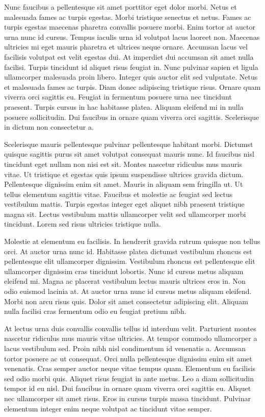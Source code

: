\documentclass[11pt,a4paper]{article}
\begin{document}
Nunc faucibus a pellentesque sit amet porttitor eget dolor morbi. Netus et malesuada fames ac turpis egestas. Morbi tristique senectus et netus. Fames ac turpis egestas maecenas pharetra convallis posuere morbi. Enim tortor at auctor urna nunc id cursus. Tempus iaculis urna id volutpat lacus laoreet non. Maecenas ultricies mi eget mauris pharetra et ultrices neque ornare. Accumsan lacus vel facilisis volutpat est velit egestas dui. At imperdiet dui accumsan sit amet nulla facilisi. Turpis tincidunt id aliquet risus feugiat in. Nunc pulvinar sapien et ligula ullamcorper malesuada proin libero. Integer quis auctor elit sed vulputate. Netus et malesuada fames ac turpis. Diam donec adipiscing tristique risus. Ornare quam viverra orci sagittis eu. Feugiat in fermentum posuere urna nec tincidunt praesent. Turpis cursus in hac habitasse platea. Aliquam eleifend mi in nulla posuere sollicitudin. Dui faucibus in ornare quam viverra orci sagittis. Scelerisque in dictum non consectetur a.

Scelerisque mauris pellentesque pulvinar pellentesque habitant morbi. Dictumst quisque sagittis purus sit amet volutpat consequat mauris nunc. Id faucibus nisl tincidunt eget nullam non nisi est sit. Montes nascetur ridiculus mus mauris vitae. Ut tristique et egestas quis ipsum suspendisse ultrices gravida dictum. Pellentesque dignissim enim sit amet. Mauris in aliquam sem fringilla ut. Ut tellus elementum sagittis vitae. Faucibus et molestie ac feugiat sed lectus vestibulum mattis. Turpis egestas integer eget aliquet nibh praesent tristique magna sit. Lectus vestibulum mattis ullamcorper velit sed ullamcorper morbi tincidunt. Lorem sed risus ultricies tristique nulla.

Molestie at elementum eu facilisis. In hendrerit gravida rutrum quisque non tellus orci. At auctor urna nunc id. Habitasse platea dictumst vestibulum rhoncus est pellentesque elit ullamcorper dignissim. Vestibulum rhoncus est pellentesque elit ullamcorper dignissim cras tincidunt lobortis. Nunc id cursus metus aliquam eleifend mi. Magna ac placerat vestibulum lectus mauris ultrices eros in. Non odio euismod lacinia at. At auctor urna nunc id cursus metus aliquam eleifend. Morbi non arcu risus quis. Dolor sit amet consectetur adipiscing elit. Aliquam nulla facilisi cras fermentum odio eu feugiat pretium nibh.

At lectus urna duis convallis convallis tellus id interdum velit. Parturient montes nascetur ridiculus mus mauris vitae ultricies. At tempor commodo ullamcorper a lacus vestibulum sed. Proin nibh nisl condimentum id venenatis a. Accumsan tortor posuere ac ut consequat. Orci nulla pellentesque dignissim enim sit amet venenatis. Cras semper auctor neque vitae tempus quam. Elementum eu facilisis sed odio morbi quis. Aliquet risus feugiat in ante metus. Leo a diam sollicitudin tempor id eu nisl. Dui faucibus in ornare quam viverra orci sagittis eu. Aliquet nec ullamcorper sit amet risus. Eros in cursus turpis massa tincidunt. Pulvinar elementum integer enim neque volutpat ac tincidunt vitae semper.
\end{document}

